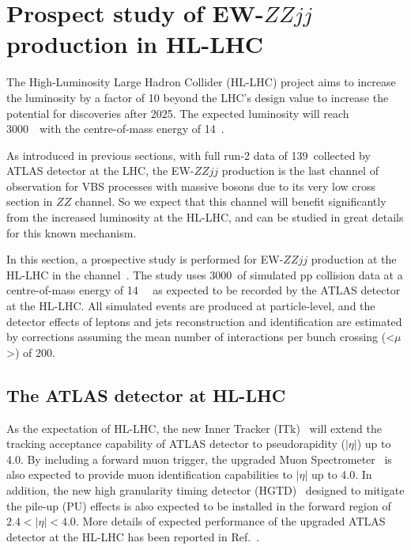 \section{Prospect study of EW-$ZZjj$ production in HL-LHC}

The High-Luminosity Large Hadron Collider (HL-LHC) project aims to increase the luminosity by a factor of 10 beyond the LHC’s design value 
to increase the potential for discoveries after 2025.
The expected luminosity will reach 3000~\ifb~with the centre-of-mass energy of 14~\tev.

As introduced in previous sections, with full run-2 data of 139~\ifb collected by ATLAS detector at the LHC, 
the EW-$ZZjj$ production is the last channel of observation for VBS processes with massive bosons 
due to its very low cross section in $ZZ$ channel.
So we expect that this channel will benefit significantly from the increased luminosity at the HL-LHC,
and can be studied in great details for this known mechanism.

In this section, a prospective study is performed for EW-$ZZjj$ production at the HL-LHC in the \llll channel~\cite{ATL-PHYS-PUB-2018-029}.
The study uses 3000~\ifb of simulated pp collision data at a centre-of-mass energy of 14~\tev~ as expected to be recorded by the ATLAS detector at the HL-LHC.
All simulated events are produced at particle-level, 
and the detector effects of leptons and jets reconstruction and identification are estimated by corrections
assuming the mean number of interactions per bunch crossing (<$\mu$>) of 200.

\subsection{The ATLAS detector at HL-LHC}

As the expectation of HL-LHC, the new Inner Tracker (ITk)~\cite{Collaboration:2285585}
 will extend the tracking acceptance capability of ATLAS detector to pseudorapidity ($|\eta|$) up to 4.0.
By including a forward muon trigger, the upgraded Muon Spectrometer~\cite{Collaboration:2285580} is also expected to provide 
muon identification capabilities to $|\eta|$ up to 4.0.
In addition, the new high granularity timing detector (HGTD)~\cite{Collaboration:2623663} designed to mitigate the pile-up (PU) effects 
is also expected to be installed in the forward region of $2.4 < |\eta| < 4.0$.
More details of expected performance of the upgraded ATLAS detector at the HL-LHC has been reported in Ref.~\cite{ATL-PHYS-PUB-2016-026}.

